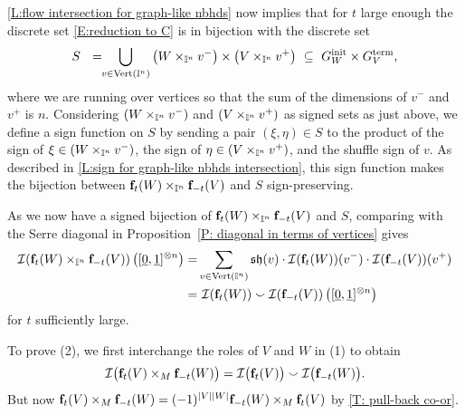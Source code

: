 \cref{L:flow intersection for graph-like nbhds} now implies that for $t$ large enough the discrete set \eqref{E:reduction to C} is in bijection with the discrete set
\begin{equation*}
	S\ \ =\!\! \bigcup_{v \in {\rm Vert}(\mathbb{I}^n)} \left(W \times_{\mathbb{I}^n} v^-\right) \times \left(V \times_{\mathbb{I}^n} v^+\right) \ \subseteq\ G^{\mathrm{init}}_W \times G^{\mathrm{term}}_V,
\end{equation*}
where we are running over vertices so that the sum of the dimensions of $v^-$ and $v^+$ is $n$.
Considering $\left(W \times_{\mathbb{I}^n} v^-\right)$ and $\left(V \times_{\mathbb{I}^n} v^+\right)$ as signed sets as just above, we define a sign function on $S$ by sending a pair $(\xi, \eta) \in S$ to the product of the sign of $\xi \in \left(W \times_{\mathbb{I}^n} v^-\right)$, the sign of $\eta \in \left(V \times_{\mathbb{I}^n} v^+\right)$, and the shuffle sign of $v$.
As described in \cref{L:sign for graph-like nbhds intersection}, this sign function makes the bijection between $\mathbf{f}_t(W) \times_{\mathbb{I}^n} \mathbf{f}_{-t}(V)$ and $S$ sign-preserving.

As we now have a signed bijection of $\mathbf{f}_t(W) \times_{\mathbb{I}^n} \mathbf{f}_{-t}(V)$ and $S$, comparing with the Serre diagonal in Proposition~\ref{P: diagonal in terms of vertices} gives
\begin{align*}
	\mathcal{I} (\mathbf{f}_t(W) \times_{\mathbb{I}^n} \mathbf{f}_{-t}(V)) \left([\underline{0}, \underline{1}]^{\otimes n}\right) = &
	\sum_{v \in {\rm Vert}(\mathbb{I}^n)} \mathfrak{sh}(v) \cdot \mathcal{I}(\mathbf{f}_t(W))(v^-) \cdot \mathcal{I}(\mathbf{f}_{-t}(V))(v^+) \\ = & \
	\mathcal{I}(\mathbf{f}_t(W)) \smallsmile \mathcal{I}(\mathbf{f}_{-t}(V)) \left([\underline{0}, \underline{1}]^{\otimes n}\right)
\end{align*}
for $t$ sufficiently large.

To prove (2), we first interchange the roles of $V$ and $W$ in (1) to obtain
\begin{equation*}
	\mathcal{I} \big( \mathbf{f}_t(V) \times_M \mathbf{f}_{-t}(W) \big) =
	\mathcal{I} \big( \mathbf{f}_t(V) \big) \smallsmile \mathcal{I} \big( \mathbf{f}_{-t}(W) \big).
\end{equation*}
But now $\mathbf{f}_t(V) \times_M \mathbf{f}_{-t}(W)=(-1)^{|V||W|}\mathbf{f}_{-t}(W) \times_M \mathbf{f}_{t}(V)$ by \cref{T: pull-back co-or}.
\hfill\qedsymbol